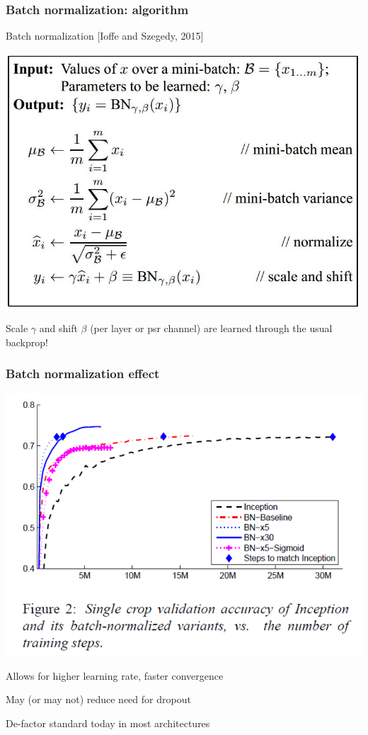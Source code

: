 \documentclass[xcolor=dvipsnames]{beamer}
\begin{document}
\begin{frame}
  \frametitle{Batch normalization: algorithm}
\bi
\item Batch normalization [Ioffe and Szegedy, 2015]

\includegraphics[width=.7\textwidth]{bn-algo}
\item Scale $\gamma$ and shift $\beta$ (per layer or psr channel) are
  learned through the usual backprop!
\ei
\end{frame}

\begin{frame}
  \frametitle{Batch normalization effect}
\includegraphics[width=.7\textwidth]{bn-inception}
  
\bi
\item Allows for higher learning rate, faster convergence
\item May (or may not) reduce need for dropout
\item De-factor standard today in most architectures
\ei

\end{frame}
\end{document}
